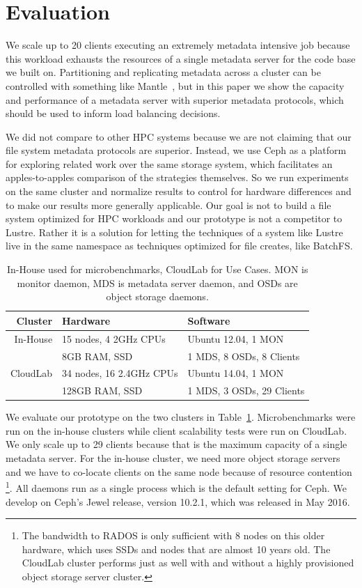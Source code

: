 \section{Evaluation}
\label{sec:evaluation}

We scale
up to 20 clients executing an extremely metadata intensive job because this
workload exhausts the resources of a single metadata server for the code base we
built on.  Partitioning and replicating metadata across a cluster can be
controlled with something like Mantle~\cite{sevilla:sc15-mantle}, but in this
paper we show the capacity and performance of a metadata server with superior
metadata protocols, which should be used to inform load balancing decisions.



We did not compare to other HPC systems because we are not claiming that our
file system metadata protocols are superior. Instead, we use Ceph as a platform
for exploring related work over the same storage system, which facilitates an
apples-to-apples comparison of the strategies themselves.  So we run
experiments on the same cluster and normalize results to control for hardware
differences and to make our results more generally applicable.  Our goal is not
to build a file system optimized for HPC workloads and our prototype is not a
competitor to Lustre. Rather it is a solution for letting the techniques of a
system like Lustre live in the same namespace as techniques optimized for file
creates, like BatchFS. 

\begin{table}
\begin{tabular}{ r | l | l}
  Cluster  & Hardware               & Software \\\hline
  In-House & 15 nodes, 4 2GHz CPUs  & Ubuntu 12.04, 1 MON\\
           & 8GB RAM, SSD           & 1 MDS, 8 OSDs, 8 Clients\\
  CloudLab & 34 nodes, 16 2.4GHz CPUs & Ubuntu 14.04, 1 MON\\
           & 128GB RAM, SSD         & 1 MDS, 3 OSDs, 29 Clients
\end{tabular}
\caption{In-House used for microbenchmarks, CloudLab for Use Cases. MON is
monitor daemon, MDS is metadata server daemon, and OSDs are object storage
daemons.\label{table:clusters}} 
\end{table}

We evaluate our prototype on the two clusters in Table~\ref{table:clusters}.
Microbenchmarks were run on the in-house clusters while client scalability
tests were run on CloudLab. We only scale up to 29 clients because that is the
maximum capacity of a single metadata server. For the in-house cluster, we need
more object storage servers and we have to co-locate clients on the same node
because of resource contention \footnote{The bandwidth to RADOS is only
sufficient with 8 nodes on this older hardware, which uses SSDs and nodes that
are almost 10 years old.  The CloudLab cluster performs just as well with and
without a highly provisioned object storage server cluster.}. All daemons run
as a single process which is the default setting for Ceph. We develop on Ceph's
Jewel release, version 10.2.1, which was released in May 2016.

